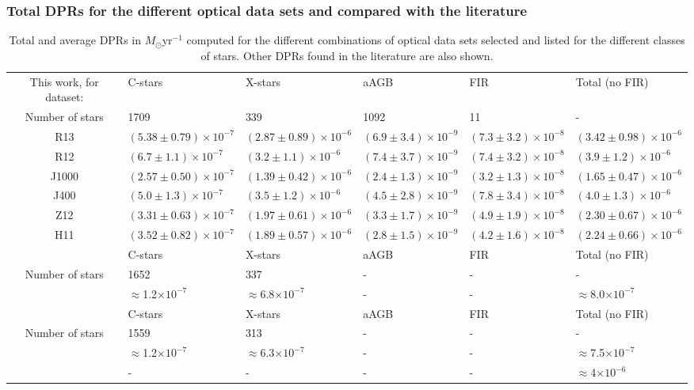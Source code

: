 \documentclass[useAMS,usenatbib]{mn2e/mn2e}
\begin{document}
{\subsubsection{Total DPRs for the different optical data sets and compared with the literature}
\begin{table*}
\caption{Total and average DPRs in $M_{\odot}$yr$^{-1}$ computed for the different combinations of optical data sets selected and listed for the different classes of stars. Other DPRs found in the literature are also shown.}
\label{DPR}
\begin{center}
\begin{tabular}{c l l l l l}
\hline
This work, for dataset:  & C-stars  &   X-stars  &  aAGB  &  FIR & Total (no FIR)   \\ 
  Number of stars & 1709 & 339 & 1092 & 11 &-\\
R13&    $(5.38\pm0.79)\times10^{-7}$ &   $(2.87\pm0.89)\times10^{-6}$&   $(6.9\pm   3.4)\times10^{-9}$ &   $(7.3\pm3.2)\times10^{-8}$ &   $(3.42\pm0.98)\times10^{-6}$\\
R12&    $(6.7\pm1.1)\times10^{-7}$ &   $(3.2\pm1.1)\times10^{-6}$ &  $(7.4\pm   3.7)\times10^{-9}$ &   $(7.4\pm 3.2)\times10^{-8}$&   $(3.9\pm1.2)\times10^{-6}$ \\
J1000&    $(2.57\pm0.50)\times10^{-7}$ &   $(1.39\pm0.42)\times10^{-6}$ &   $(2.4\pm   1.3)\times10^{-9}$ &   $(3.2\pm1.3)\times10^{-8}$&   $(1.65\pm0.47)\times10^{-6}$\\
J400&    $(5.0\pm1.3)\times10^{-7}$&   $(3.5\pm1.2)\times10^{-6}$&   $(4.5\pm   2.8)\times10^{-9}$&   $(7.8\pm3.4)\times10^{-8}$&   $(4.0\pm1.3)\times10^{-6}$\\
Z12&    $(3.31\pm0.63)\times10^{-7}$  &   $(1.97\pm0.61)\times10^{-6}$  &   $(3.3\pm   1.7)\times10^{-9}$ &   $(4.9\pm1.9)\times10^{-8}$ &   $(2.30\pm0.67)\times10^{-6}$ \\
H11&    $(3.52\pm0.82)\times10^{-7}$&   $(1.89\pm0.57)\times10^{-6}$&   $(2.8\pm   1.5)\times10^{-9}$&   $(4.2\pm1.6)\times10^{-8}$ &   $(2.24\pm0.66)\times10^{-6}$  \\
\hline
\citet{Srinivasan16}  & C-stars  &   X-stars  &  aAGB  &  FIR & Total (no FIR)   \\ 
 Number of stars & 1652 & 337 & - & - & -\\
  & $\approx$1.2$\times 10^{-7}$ &  $\approx$6.8$\times 10^{-7}$ & - & - & $\approx$8.0$\times 10^{-7}$ \\
\hline
\citet{Boyer12}  & C-stars  &   X-stars  &  aAGB  &  FIR & Total (no FIR)   \\ 
Number of stars & 1559 & 313  & - & - &- \\
  & $\approx$1.2$\times 10^{-7}$ &  $\approx$6.3$\times 10^{-7}$ & - & - & $\approx$7.5$\times 10^{-7}$\\
\hline
\citet{Matsuura13}& - & - & - & - & $\approx$4$\times 10^{-6}$\\
\hline
\end{tabular}
\end{center}
\end{table*}

}
\end{document}
